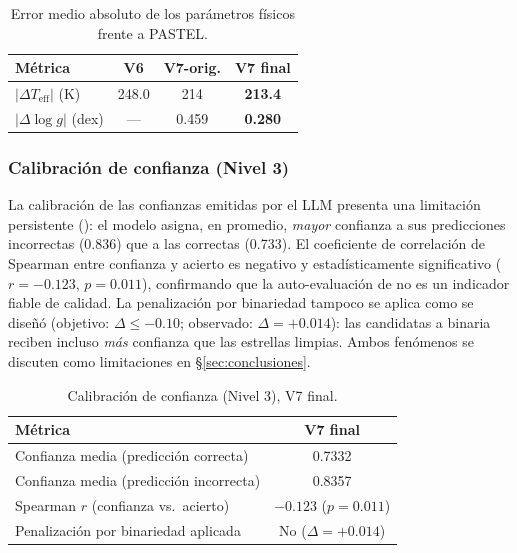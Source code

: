 \begin{table}[H]
  \centering
  \caption{Error medio absoluto de los parámetros físicos frente a PASTEL.}
  \label{tab:l2}
  \begin{tabular}{lccc}
    \toprule
    Métrica & V6 & V7-orig. & \textbf{V7 final} \\
    \midrule
    $|\Delta T_\mathrm{eff}|$ (K)   & 248.0 & 214 & \textbf{213.4} \\
    $|\Delta\log g|$ (dex)          & ---   & 0.459 & \textbf{0.280} \\
    \bottomrule
  \end{tabular}
\end{table}

\subsubsection{Calibración de confianza (Nivel 3)}
\label{sec:res-l3}

La calibración de las confianzas emitidas por el LLM presenta una limitación
persistente (): el modelo asigna, en promedio, \emph{mayor} confianza
a sus predicciones incorrectas (\num{0.836}) que a las correctas (\num{0.733}). El
coeficiente de correlación de Spearman entre confianza y acierto es negativo y
estadísticamente significativo ($r=-0.123$, $p=0.011$), confirmando que la
auto-evaluación de \AstroSage{} no es un indicador fiable de calidad. La
penalización por binariedad tampoco se aplica como se diseñó (objetivo:
$\Delta \le -0.10$; observado: $\Delta = +0.014$): las candidatas a binaria reciben
incluso \emph{más} confianza que las estrellas limpias. Ambos fenómenos se discuten
como limitaciones en §\ref{sec:conclusiones}.

\begin{table}[H]
  \centering
  \caption{Calibración de confianza (Nivel 3), V7 final.}
  \label{tab:l3}
  \begin{tabular}{lc}
    \toprule
    Métrica & V7 final \\
    \midrule
    Confianza media (predicción correcta)   & 0.7332 \\
    Confianza media (predicción incorrecta) & 0.8357 \\
    Spearman $r$ (confianza vs.\ acierto)    & $-0.123$ ($p=0.011$) \\
    Penalización por binariedad aplicada     & No ($\Delta = +0.014$) \\
    \bottomrule
  \end{tabular}
\end{table}

